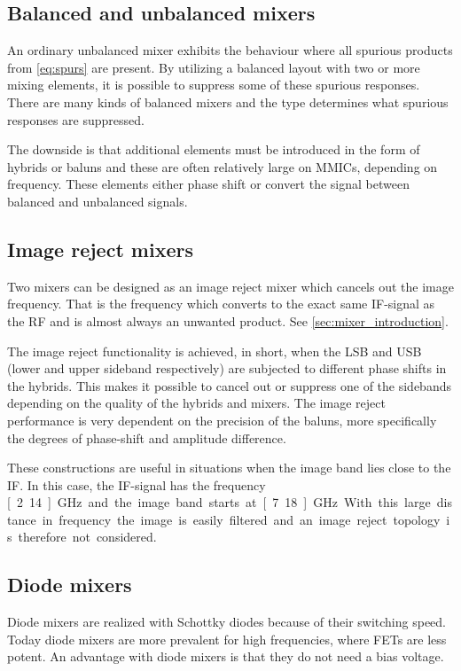 		\subsection{Balanced and unbalanced mixers}
			An ordinary unbalanced mixer exhibits the behaviour where all spurious products from \autoref{eq:spurs} are present. By utilizing a balanced layout with two or more mixing elements, it is possible to suppress some of these spurious responses. There are many kinds of balanced mixers and the type determines what spurious responses are suppressed.\autocites{maas92}{dinari09}

			The downside is that additional elements must be introduced in the form of hybrids or baluns and these are often relatively large on MMICs, depending on frequency. These elements either phase shift or convert the signal between balanced and unbalanced signals.

		\subsection{Image reject mixers}
			Two mixers can be designed as an image reject mixer which cancels out the image frequency. That is the frequency which converts to the exact same IF-signal as the RF and is almost always an unwanted product. See \autoref{sec:mixer_introduction}.

			The image reject functionality is achieved, in short, when the LSB and USB (lower and upper sideband respectively) are subjected to different phase shifts in the hybrids. This makes it possible to cancel out or suppress one of the sidebands depending on the quality of the hybrids and mixers. The image reject performance is very dependent on the precision of the baluns, more specifically the degrees of phase-shift and amplitude difference.\autocite{henderson85} %

			These constructions are useful in situations when the image band lies close to the IF. In this case, the IF-signal has the frequency \unit[2.14]{GHz} and the image band starts at \unit[7.18]{GHz}. With this large distance in frequency the image is easily filtered and an image reject topology is therefore not considered.

		\subsection{Diode mixers}
			Diode mixers are realized with Schottky diodes because of their switching speed. Today diode mixers are more prevalent for high frequencies, where FETs are less potent. An advantage with diode mixers is that they do not need a bias voltage.

